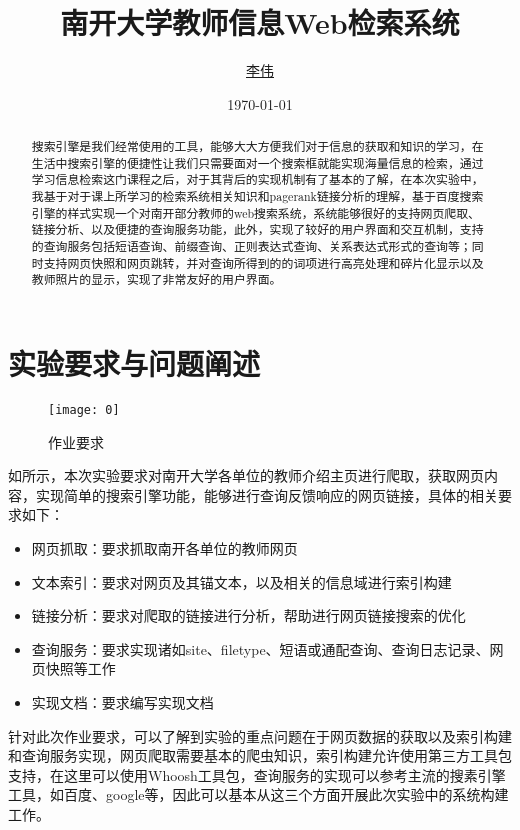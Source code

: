 \documentclass[lang=cn,11pt]{elegantpaper}
\title{南开大学教师信息Web检索系统}
\author{\href{https://github.com/Jack-Lio}{李伟}}
\institute{1711350   计算机科学与技术一班}
\date{\today}
\begin{document}
\maketitle

\begin{abstract}
\noindent 搜索引擎是我们经常使用的工具，能够大大方便我们对于信息的获取和知识的学习，在生活中搜索引擎的便捷性让我们只需要面对一个搜索框就能实现海量信息的检索，通过学习信息检索这门课程之后，对于其背后的实现机制有了基本的了解，在本次实验中，我基于对于课上所学习的检索系统相关知识和pagerank链接分析的理解，基于百度搜索引擎的样式实现一个对南开部分教师的web搜索系统，系统能够很好的支持网页爬取、链接分析、以及便捷的查询服务功能，此外，实现了较好的用户界面和交互机制，支持的查询服务包括短语查询、前缀查询、正则表达式查询、关系表达式形式的查询等；同时支持网页快照和网页跳转，并对查询所得到的的词项进行高亮处理和碎片化显示以及教师照片的显示，实现了非常友好的用户界面。
\end{abstract}


\section{实验要求与问题阐述}

\begin{figure}[htbp]
	\centering
	\texttt{[image: 0]}
	\caption{作业要求 \label{fig:0}}
\end{figure}

如所示，本次实验要求对南开大学各单位的教师介绍主页进行爬取，获取网页内容，实现简单的搜索引擎功能，能够进行查询反馈响应的网页链接，具体的相关要求如下：

\begin{itemize}
	\item 网页抓取：要求抓取南开各单位的教师网页
	\item 文本索引：要求对网页及其锚文本，以及相关的信息域进行索引构建
	\item 链接分析：要求对爬取的链接进行分析，帮助进行网页链接搜索的优化
	\item 查询服务：要求实现诸如site、filetype、短语或通配查询、查询日志记录、网页快照等工作
	\item 实现文档：要求编写实现文档
\end{itemize}



针对此次作业要求，可以了解到实验的重点问题在于网页数据的获取以及索引构建和查询服务实现，网页爬取需要基本的爬虫知识，索引构建允许使用第三方工具包支持，在这里可以使用Whoosh工具包，查询服务的实现可以参考主流的搜素引擎工具，如百度、google等，因此可以基本从这三个方面开展此次实验中的系统构建工作。
\end{document}
